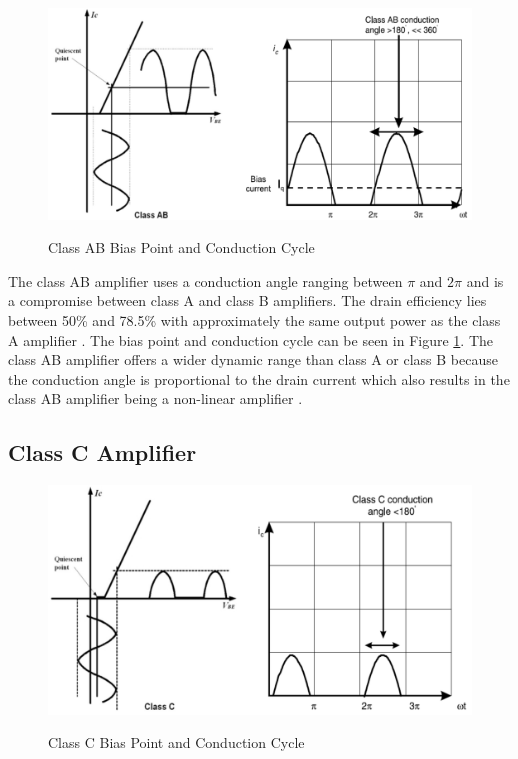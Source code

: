 \begin{figure}
  \centering
  \includegraphics[width=6in]{figures/classes/classab_bias}\\
  \caption{Class AB Bias Point and Conduction Cycle \cite{Rosu2001}}\label{classab_bias}
\end{figure}


The class AB amplifier uses a conduction angle ranging between $\pi$ and $2\pi$ and is a compromise between class A and class B amplifiers. The drain efficiency lies between 50\% and 78.5\% with approximately the same output power as the class A amplifier \cite{C.Cripps2006}. The bias point and conduction cycle can be seen in Figure \ref{classab_bias}.
The class AB amplifier offers a wider dynamic range than class A or class B because the conduction angle is proportional to the drain current which also results in the class AB amplifier being a non-linear amplifier \cite{C.Cripps2006}.

\subsection{Class C Amplifier}

\begin{figure}
  \centering
  \includegraphics[width=6in]{figures/classes/classc_bias}\\
  \caption{Class C Bias Point and Conduction Cycle \cite{Rosu2001}}\label{classc_bias}
\end{figure}

